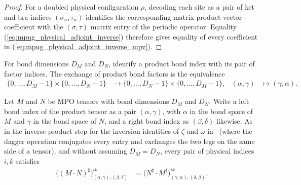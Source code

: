 \begin{proof}\leanok
    For a doubled physical configuration $\rho$, decoding each site as a pair of
    ket and bra indices $(\sigma_n,\tau_n)$ identifies the corresponding matrix
    product vector coefficient with the $(\sigma,\tau)$ matrix entry of the
    periodic operator. Equality
    (\ref{eq:mpug_physical_adjoint_inverse}) therefore gives equality of every
    coefficient in (\ref{eq:mpug_physical_adjoint_inverse_mpv}).
\end{proof}

\begin{definition}
    \label{def:mpug_product_bond_swap}
    \leanok
    For bond dimensions $D_M$ and $D_N$, identify a product bond index with
    its pair of factor indices. The exchange of product bond factors is the
    equivalence
    \begin{align}
        \{0,\ldots,D_M-1\}\times\{0,\ldots,D_N-1\}
                                                    & \longrightarrow
        \{0,\ldots,D_N-1\}\times\{0,\ldots,D_M-1\}, &
        (\alpha,\gamma)                             & \longmapsto (\gamma,\alpha).
        \label{eq:mpug_product_bond_swap}
    \end{align}
\end{definition}

\begin{lemma}
    \label{thm:mpug_physical_adjoint_product_reversal}
    \leanok
    Let $M$ and $N$ be MPO tensors with bond dimensions $D_M$ and $D_N$.
    Write a left bond index of the product tensor as a pair
    $(\alpha,\gamma)$, with $\alpha$ in the bond space of $M$ and $\gamma$ in
    the bond space of $N$, and a right bond index as $(\beta,\delta)$
    likewise.
    As in the inverse-product step for the inversion identities of $\zeta$ and
    $\omega$ in~\cite[lines~1662--1677]{FrancoRubio2025MPUGauging} (where the
    dagger operation conjugates every entry and exchanges the two legs on the
    same side of a tensor), and without assuming $D_M=D_N$, every pair of
    physical indices $i,k$ satisfies
    \begin{align}
        \bigl((M\mathbin{\cdot}N)^\sharp\bigr)^{ik}
            _{(\alpha,\gamma),(\beta,\delta)}
         & =\bigl(N^\sharp\mathbin{\cdot}M^\sharp\bigr)^{ik}
        _{(\gamma,\alpha),(\delta,\beta)}.
        \label{eq:mpug_physical_adjoint_product_reversal}
    \end{align}
\end{lemma}

